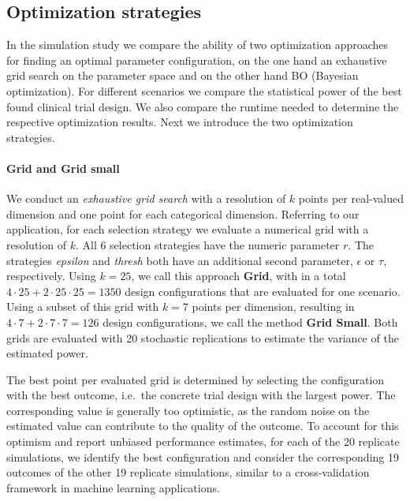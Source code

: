 \documentclass[bimj,fleqn]{w-art}
\theoremstyle{plain}
\theoremstyle{definition}
\begin{document}
\subsection{Optimization strategies}

In the simulation study we compare the ability of two optimization approaches for finding an optimal parameter configuration, on the one hand an exhaustive grid search on the parameter space and on the other hand BO (Bayesian optimization).
For different scenarios we compare the statistical power of the best found clinical trial design.
We also compare the runtime needed to determine the respective optimization results.
Next we introduce the two optimization strategies.

\paragraph{Grid and Grid small}
We conduct an \emph{exhaustive grid search} with a resolution of $k$ points per real-valued dimension and one point for each categorical dimension.
Referring to our application, for each selection strategy we evaluate a numerical grid with a resolution of $k$.
All 6 selection strategies have the numeric parameter $r$.
The strategies \emph{epsilon} and \emph{thresh} both have an additional second parameter, $\epsilon$ or $\tau$, respectively.
Using $k=25$, we call this approach \textbf{Grid},
with in a total $4 \cdot 25 + 2 \cdot 25 \cdot 25 = 1350$ design configurations that are evaluated for one scenario.
Using a subset of this grid with $k=7$ points per dimension, resulting in $4 \cdot 7 + 2 \cdot 7 \cdot 7 = 126$ design configurations, we call the method \textbf{Grid Small}.
Both grids are evaluated with 20 stochastic replications to estimate the variance of the estimated power.

The best point per evaluated grid is determined by selecting the configuration with the best outcome, i.e.\  the concrete trial design with the largest power.
The corresponding value is generally too optimistic, as the random noise on the estimated value can contribute to the quality of the outcome.
To account for this optimism and report unbiased performance estimates, for each of the 20 replicate simulations, we identify the best configuration and consider the corresponding 19 outcomes of the other 19 replicate simulations, similar to a cross-validation framework in machine learning applications. 
\end{document}
